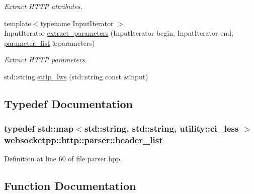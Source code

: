 \begin{DoxyCompactItemize}
\begin{DoxyCompactList}\small\item\em Extract H\+T\+T\+P attributes. \end{DoxyCompactList}\item 
{\footnotesize template$<$typename Input\+Iterator $>$ }\\Input\+Iterator \hyperlink{namespacewebsocketpp_1_1http_1_1parser_adabfd491d364be43bee4c7cad63e7e08}{extract\+\_\+parameters} (Input\+Iterator begin, Input\+Iterator end, \hyperlink{namespacewebsocketpp_1_1http_a2c285bc959df5a63bf962bed842fccfb}{parameter\+\_\+list} \&parameters)
\begin{DoxyCompactList}\small\item\em Extract H\+T\+T\+P parameters. \end{DoxyCompactList}\item 
std\+::string \hyperlink{namespacewebsocketpp_1_1http_1_1parser_ae656f7130716b25fb2a34cee77a0444e}{strip\+\_\+lws} (std\+::string const \&input)
\end{DoxyCompactItemize}


\subsection{Typedef Documentation}
\hypertarget{namespacewebsocketpp_1_1http_1_1parser_a4bb5b2821dab6a182bfe4c5415229e6e}{}
\subsubsection[{header\+\_\+list}]{\setlength{\rightskip}{0pt plus 5cm}typedef std\+::map$<$std\+::string, std\+::string, {\bf utility\+::ci\+\_\+less} $>$ {\bf websocketpp\+::http\+::parser\+::header\+\_\+list}}\label{namespacewebsocketpp_1_1http_1_1parser_a4bb5b2821dab6a182bfe4c5415229e6e}


Definition at line 60 of file parser.\+hpp.



\subsection{Function Documentation}
\hypertarget{namespacewebsocketpp_1_1http_1_1parser_a263c7c466bbed56948d5877b9c33c354}{}
